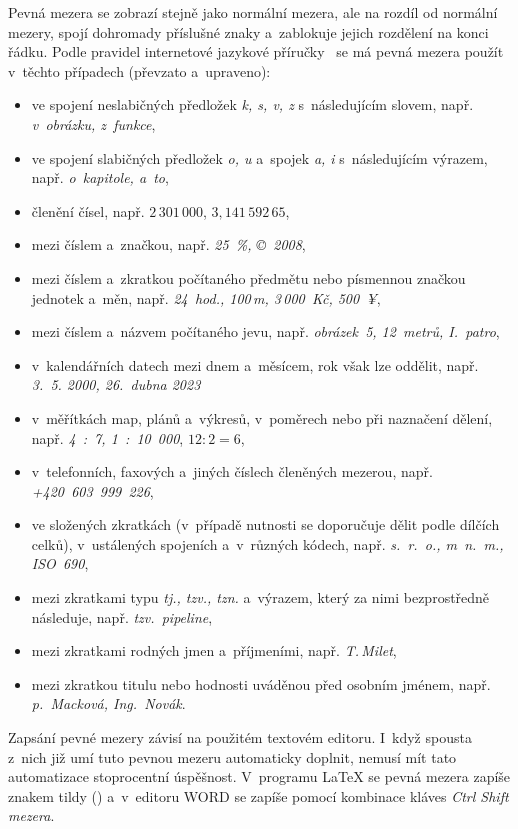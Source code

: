 Pevná mezera se zobrazí stejně jako normální mezera, ale na rozdíl od normální
mezery, spojí dohromady příslušné znaky a~zablokuje jejich rozdělení na konci
řádku. Podle pravidel internetové jazykové příručky~\cite{Ustav_pro_jazyk_cesky}
se má pevná mezera použít v~těchto případech (převzato a~upraveno):
\begin{itemize}
    \item ve spojení neslabičných předložek \emph{k, s, v, z} s~následujícím
    slovem, např. \emph{v~obrázku, z~funkce},
    \item ve spojení slabičných předložek \emph{o, u} a~spojek \emph{a, i}
    s~následujícím výrazem, např. \emph{o~kapitole, a~to},
    \item členění čísel, např. $\mathit{2\,301\,000}$, $\mathit{3,\!141\,592\,65}$,
    \item mezi číslem a~značkou, např. \emph{25~\%, \copyright~2008},
    \item mezi číslem a~zkratkou počítaného předmětu nebo písmennou značkou
    jednotek a~měn, např. \emph{24~hod., 100\,m, 3\,000~Kč, 500~¥},
    \item mezi číslem a~názvem počítaného jevu, např. \emph{obrázek~5, 12~metrů,
    I.~patro},
    \item v~kalendářních datech mezi dnem a~měsícem, rok však lze oddělit, např.
    \emph{3.~5. 2000, 26.~dubna 2023}
    \item v~měřítkách map, plánů a~výkresů, v~poměrech nebo při naznačení dělení,
    např. \emph{4~:~7, 1~:~10~000}, $\mathit{12:2=6}$,
    \item v~telefonních, faxových a~jiných číslech členěných mezerou, např. 
    \emph{+420~603~999~226},
    \item ve složených zkratkách (v~případě nutnosti se doporučuje dělit podle
    dílčích celků), v~ustálených spojeních a~v~různých kódech, např.
    \emph{s.~r.~o., m~n.~m., ISO~690},
    \item mezi zkratkami typu \emph{tj., tzv., tzn.} a~výrazem, který za nimi
    bezprostředně následuje, např. \emph{tzv.~pipeline},
    \item mezi zkratkami rodných jmen a~příjmeními, např. \emph{T.\,Milet},
    \item mezi zkratkou titulu nebo hodnosti uváděnou před osobním jménem, např.
    \emph{p.~Macková, Ing.~Novák}.
\end{itemize}

Zapsání pevné mezery závisí na použitém textovém editoru. I~když spousta z~nich
již umí tuto pevnou mezeru automaticky doplnit, nemusí mít tato automatizace
stoprocentní úspěšnost. V~programu {\LaTeX} se pevná mezera zapíše znakem tildy
(\texttildelow) a~v~editoru WORD se zapíše pomocí kombinace kláves
\emph{Ctrl Shift mezera}.

